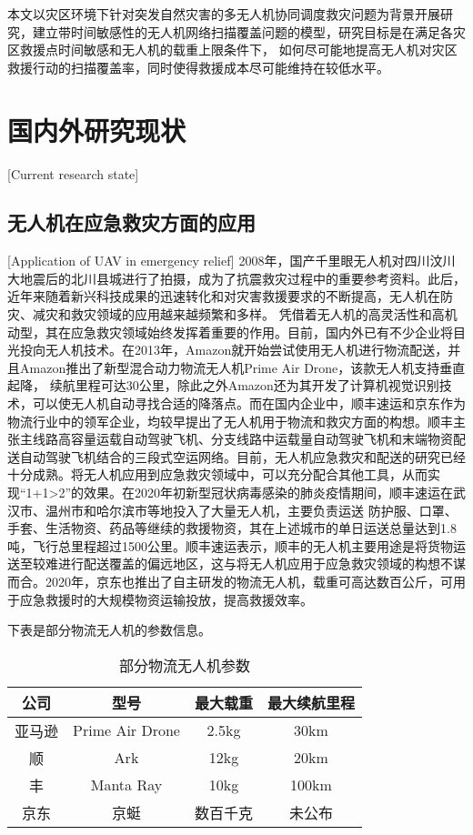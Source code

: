 本文以灾区环境下针对突发自然灾害的多无人机协同调度救灾问题为背景开展研究，建立带时间敏感性的无人机网络扫描覆盖问题的模型，研究目标是在满足各灾区救援点时间敏感和无人机的载重上限条件下，
如何尽可能地提高无人机对灾区救援行动的扫描覆盖率，同时使得救援成本尽可能维持在较低水平。


\section{国内外研究现状}[Current research state]

\subsection{无人机在应急救灾方面的应用}[Application of UAV in emergency relief]
2008年，国产千里眼无人机对四川汶川大地震后的北川县城进行了拍摄，成为了抗震救灾过程中的重要参考资料。此后，近年来随着新兴科技成果的迅速转化和对灾害救援要求的不断提高，无人机在防灾、减灾和救灾领域的应用越来越频繁和多样。
凭借着无人机的高灵活性和高机动型，其在应急救灾领域始终发挥着重要的作用。目前，国内外已有不少企业将目光投向无人机技术。在2013年，Amazon就开始尝试使用无人机进行物流配送，并且Amazon推出了新型混合动力物流无人机Prime Air Drone，该款无人机支持垂直起降，
续航里程可达30公里，除此之外Amazon还为其开发了计算机视觉识别技术，可以使无人机自动寻找合适的降落点。而在国内企业中，顺丰速运和京东作为物流行业中的领军企业，均较早提出了无人机用于物流和救灾方面的构想。顺丰主张主线路高容量运载自动驾驶飞机、分支线路中运载量自动驾驶飞机和末端物资配送自动驾驶飞机结合的三段式空运网络。目前，无人机应急救灾和配送的研究已经十分成熟。将无人机应用到应急救灾领域中，可以充分配合其他工具，从而实现“1+1>2”的效果。在2020年初新型冠状病毒感染的肺炎疫情期间，顺丰速运在武汉市、温州市和哈尔滨市等地投入了大量无人机，主要负责运送
防护服、口罩、手套、生活物资、药品等继续的救援物资，其在上述城市的单日运送总量达到1.8吨，飞行总里程超过1500公里。顺丰速运表示，顺丰的无人机主要用途是将货物运送至较难进行配送覆盖的偏远地区，这与将无人机应用于应急救灾领域的构想不谋而合。2020年，京东也推出了自主研发的物流无人机，载重可高达数百公斤，可用于应急救援时的大规模物资运输投放，提高救援效率。


下表是部分物流无人机的参数信息。
\begin{table}[h]
  \begin{center}
  \caption{部分物流无人机参数} 
  \begin{tabular}{c|c|c|c}
  \hline
  \hline
  公司 & 型号 & 最大载重 & 最大续航里程 \\
  \hline
  \hline
  亚马逊 & Prime Air Drone & 2.5kg & 30km \\
  \hline
  顺 & Ark & 12kg & 20km \\
  丰 & Manta Ray & 10kg & 100km \\
  \hline
  京东 & 京蜓 & 数百千克 & 未公布 \\ 
  \hline
  \end{tabular}
  \end{center}
  \end{table}

